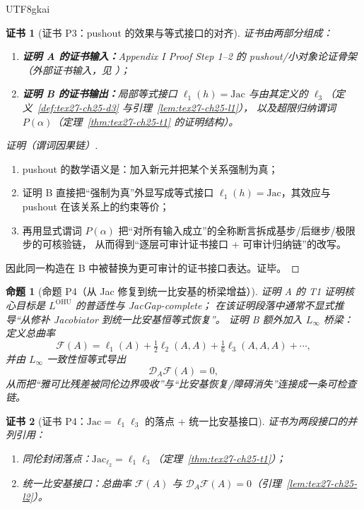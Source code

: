 \documentclass[12pt]{article}
\newtheorem{proposition}{命题}[section]
\newtheorem{Certificate}{证书}[section]
\begin{document}
\begin{CJK*}{UTF8}{gkai}
\begin{Certificate}[证书 P3：pushout 的效果与等式接口的对齐]
\label{cert:tex27-ch26-p3}
证书由两部分组成：
\begin{enumerate}
  \item \textbf{证明 A 的证书输入：}Appendix I Proof Step 1--2 的 pushout/小对象论证骨架（外部证书输入，见 \cite{GaoZheng2025GFramework}）；
  \item \textbf{证明 B 的证书输出：}局部等式接口 $\ell_1(h)=\mathrm{Jac}$ 与由其定义的 $\ell_3$（定义~\ref{def:tex27-ch25-d3} 与引理~\ref{lem:tex27-ch25-l1}），
  以及超限归纳谓词 $P(\alpha)$（定理~\ref{thm:tex27-ch25-t1} 的证明结构）。
\end{enumerate}
\end{Certificate}

\begin{proof}[证明（谓词因果链）]
\begin{enumerate}
  \item pushout 的数学语义是：加入新元并把某个关系强制为真；
  \item 证明 B 直接把“强制为真”外显写成等式接口 $\ell_1(h)=\mathrm{Jac}$，其效应与 pushout 在该关系上的约束等价；
  \item 再用显式谓词 $P(\alpha)$ 把“对所有输入成立”的全称断言拆成基步/后继步/极限步的可核验链，
  从而得到“逐层可审计证书接口 + 可审计归纳链”的改写。
\end{enumerate}
因此同一构造在 B 中被替换为更可审计的证书接口表达。证毕。
\end{proof}

\begin{proposition}[命题 P4（从 Jac 修复到统一比安基的桥梁增益）]
\label{prop:tex27-ch26-p4}
证明 A 的 T1 证明核心目标是 $L^{\mathrm{OHU}}$ 的普适性与 JacGap-complete；
在该证明段落中通常不显式推导“从修补 Jacobiator 到统一比安基恒等式恢复”。
证明 B 额外加入 $L_\infty$ 桥梁：定义总曲率
\[
  \mathcal{F}(A)=\ell_1(A)+\tfrac12\ell_2(A,A)+\tfrac16\ell_3(A,A,A)+\cdots,
\]
并由 $L_\infty$ 一致性恒等式导出
\[
  \mathcal{D}_A\mathcal{F}(A)=0,
\]
从而把“雅可比残差被同伦边界吸收”与“比安基恢复/障碍消失”连接成一条可检查链。
\end{proposition}

\begin{Certificate}[证书 P4：$\mathrm{Jac}=\ell_1\ell_3$ 的落点 + 统一比安基接口]
\label{cert:tex27-ch26-p4}
证书为两段接口的并列引用：
\begin{enumerate}
  \item 同伦封闭落点：$\mathrm{Jac}_{\ell_2}=\ell_1\ell_3$（定理~\ref{thm:tex27-ch25-t1}）；
  \item 统一比安基接口：总曲率 $\mathcal{F}(A)$ 与 $\mathcal{D}_A\mathcal{F}(A)=0$（引理~\ref{lem:tex27-ch25-l2}）。
\end{enumerate}
\end{Certificate}


\end{CJK*}
\end{document}

